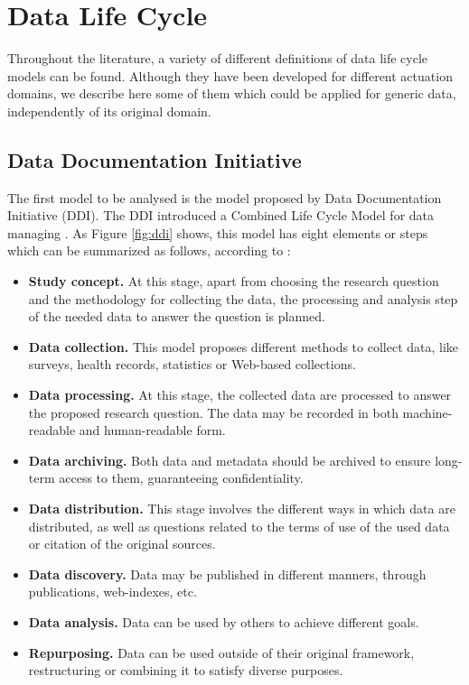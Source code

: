 \section{Data Life Cycle}

Throughout the literature, a variety of different definitions of data life cycle models can be found. Although they have been developed for different actuation domains, we describe here some of them which could be applied for generic data, independently of its original domain.

\subsection{Data Documentation Initiative}

The first model to be analysed is the model proposed by Data Documentation Initiative (DDI). The DDI introduced a Combined Life Cycle Model for data managing \cite{data_documentation_initiative_overview_2008}. As Figure \ref{fig:ddi} shows, this model has eight elements or steps which can be summarized as follows, according to \cite{ball_review_2012}:

\begin{itemize}
    \item \textbf{Study concept.} At this stage, apart from choosing the research question and the methodology for collecting the data, the processing and analysis step of the needed data to answer the question is planned.
    \item \textbf{Data collection.} This model proposes different methods to collect data, like surveys, health records, statistics or Web-based collections.
    \item \textbf{Data processing.} At this stage, the collected data are processed to answer the proposed research question. The data may be recorded in both machine-readable and human-readable form.
    \item \textbf{Data archiving.} Both data and metadata should be archived to ensure long-term access to them, guaranteeing confidentiality.
    \item \textbf{Data distribution.} This stage involves the different ways in which data are distributed, as well as questions related to the terms of use of the used data or citation of the original sources. 
    \item \textbf{Data discovery.} Data may be published in different manners, through publications, web-indexes, etc.
    \item \textbf{Data analysis.} Data can be used by others to achieve different goals.
    \item \textbf{Repurposing.} Data can be used outside of their original framework, restructuring or combining it to satisfy diverse purposes.
\end{itemize}

